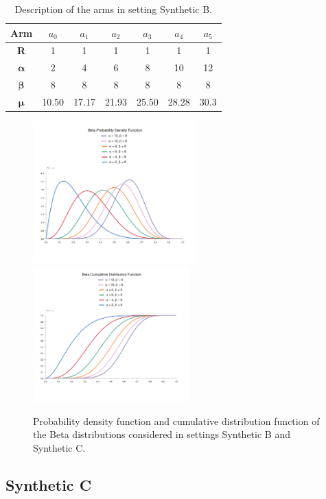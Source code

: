 \begin{table}[H]
	\centering
	\caption{Description of the arms in setting Synthetic B.}
	
	\begin{tabular}{|c|cccccc|}
		\hline
		\textbf{Arm}          & $a_0$ & $a_1$ & $a_2$ & $a_3$ & $a_4$ & $a_5$ \\ \hline
		\textbf{R}            & 1     & 1     & 1     & 1     & 1     & 1     \\
		$\boldsymbol{\alpha}$ & 2     & 4     & 6     & 8     & 10    & 12    \\
		$\boldsymbol{\beta}$  & 8     & 8     & 8     & 8     & 8     & 8     \\
		$\boldsymbol{\mu}$    & 10.50 & 17.17 & 21.93 & 25.50 & 28.28 & 30.3  \\ \hline
	\end{tabular}

\label{tabSB}
\end{table}
\begin{figure}[H]
	\centering
	\includegraphics[width=6.26cm]{./images/chart (1)-1.png}\quad\includegraphics[width=6cm]{./images/chart (2)-1.png}
	\caption{Probability density function and cumulative distribution function of the Beta distributions considered in settings Synthetic B and Synthetic C.}
	\label{beta}
\end{figure}

\subsection{Synthetic C}

